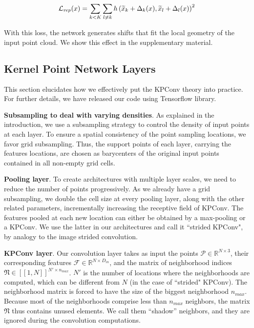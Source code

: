 \documentclass[10pt,twocolumn,letterpaper]{article}
\begin{document}
\begin{equation} \label{eq:8}
    \mathcal{L}_\mathit{rep}(x) = \sum_{k < K}\sum_{l\neq k} h\left(\widetilde{x}_k + \Delta_k(x), \widetilde{x}_l + \Delta_l(x)\right)^2
    \vspace{-1ex}
\end{equation}

With this loss, the network generates shifts that fit the local geometry of the input point cloud. We show this effect in the supplementary material.


\subsection{Kernel Point Network Layers}
\label{section_33}

This section elucidates how we effectively put the KPConv theory into practice. For further details, we have released our code using Tensorflow library.

\noindent
\textbf{Subsampling to deal with varying densities}. As explained in the introduction, we use a subsampling strategy to control the density of input points at each layer. To ensure a spatial consistency of the point sampling locations, we favor grid subsampling. Thus, the support points of each layer, carrying the features locations, are chosen as barycenters of the original input points contained in all non-empty grid cells. 

\noindent
\textbf{Pooling layer}. To create architectures with multiple layer scales, we need to reduce the number of points progressively. As we already have a grid subsampling, we double the cell size at every pooling layer, along with the other related parameters, incrementally increasing the receptive field of KPConv. The features pooled at each new location can either be obtained by a max-pooling or a KPConv. We use the latter in our architectures and call it ``strided KPConv", by analogy to the image strided convolution.

\noindent
\textbf{KPConv layer}. Our convolution layer takes as input the points $\mathcal{P} \in \mathbb{R}^{N \times 3}$, their corresponding features $\mathcal{F} \in \mathbb{R}^{N \times D_{in}}$, and the matrix of neighborhood indices $\mathfrak{N} \in {[\![1,N]\!]}^{N' \times n_{max}}$. $N'$ is the number of locations where the neighborhoods are computed, which can be different from $N$ (in the case of ``strided" KPConv). The neighborhood matrix is forced to have the size of the biggest neighborhood $n_{max}$. Because most of the neighborhoods comprise less than $n_{max}$ neighbors, the matrix $\mathfrak{N}$ thus contains unused elements. We call them “shadow” neighbors, and they are ignored during the convolution computations.
\end{document}
